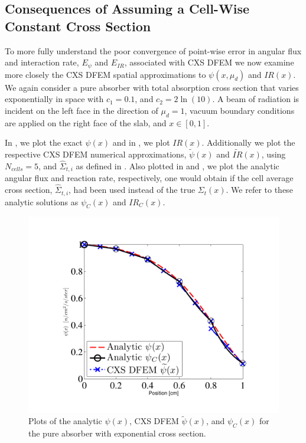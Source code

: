 \subsection{Consequences of Assuming a Cell-Wise Constant Cross Section}

To more fully understand the poor convergence of point-wise error in angular flux and interaction rate, $E_{\psi}$ and $E_{IR}$, associated with CXS DFEM  we now examine more closely the CXS DFEM spatial approximations to $\psi(x,\mu_d)$ and $IR(x)$. 
We again consider a pure absorber with total absorption cross section that varies exponentially in space with $c_1 = 0.1$, and $c_2 = 2\ln(10)$.  
A beam of radiation is incident on the left face in the direction of $\mu_d=1$, vacuum boundary conditions are applied on the right face of the slab, and $x\in[0, 1]$.    

In , we plot the exact $\psi(x)$ and in , we plot $IR(x)$.  
Additionally we plot the respective CXS DFEM numerical approximations, $\widetilde{\psi}(x)$ and $\widetilde{IR}(x)$, using $N_{cells}=5$, and $\hat{\Sigma}_{t,i}$ as defined in . 
Also plotted in  and , we plot the analytic angular flux and reaction rate, respectively, one would obtain if the cell average cross section, $\hat{\Sigma}_{t,i}$, had been used instead of the true $\Sigma_t(x)$.
We refer to these analytic solutions as $\psi_C(x)$ and $IR_C(x)$.
\begin{figure}[!hbp]
\centering
\includegraphics[width=12cm]{chapter3_variable_xs/Psi_Blades.pdf}
\caption{Plots of the analytic $\psi(x)$, CXS DFEM $\widetilde{\psi}(x)$, and $\psi_C(x)$ for the pure absorber with exponential cross section.}
\label{fig:cxs_blades_psi}
\end{figure}

